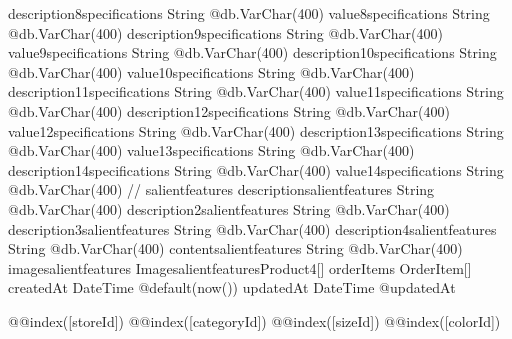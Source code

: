 {  description8specifications   String                         @db.VarChar(400)
  value8specifications         String                         @db.VarChar(400)
  description9specifications   String                         @db.VarChar(400)
  value9specifications         String                         @db.VarChar(400)
  description10specifications  String                         @db.VarChar(400)
  value10specifications        String                         @db.VarChar(400)
  description11specifications  String                         @db.VarChar(400)
  value11specifications        String                         @db.VarChar(400)
  description12specifications  String                         @db.VarChar(400)
  value12specifications        String                         @db.VarChar(400)
  description13specifications  String                         @db.VarChar(400)
  value13specifications        String                         @db.VarChar(400)
  description14specifications  String                         @db.VarChar(400)
  value14specifications        String                         @db.VarChar(400)
  // salientfeatures
  descriptionsalientfeatures   String                         @db.VarChar(400)
  description2salientfeatures  String                         @db.VarChar(400)
  description3salientfeatures  String                         @db.VarChar(400)
  description4salientfeatures  String                         @db.VarChar(400)
  contentsalientfeatures       String                         @db.VarChar(400)
  imagesalientfeatures ImagesalientfeaturesProduct4[]
  orderItems                   OrderItem[]
  createdAt                    DateTime                       @default(now())
  updatedAt                    DateTime                       @updatedAt

  @@index([storeId])
  @@index([categoryId])
  @@index([sizeId])
  @@index([colorId])
}

